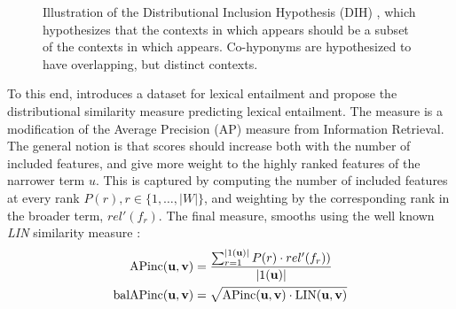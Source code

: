 \begin{figure}
\centering
{}
\caption{Illustration of the Distributional Inclusion Hypothesis (DIH)
  \cite{zhitomirskygeffet:2005:acl}, which hypothesizes that the contexts in
  which  appears should be a subset of the contexts in which
   appears. Co-hyponyms are hypothesized to have overlapping, but
  distinct contexts.}
\label{fig:dih}
\end{figure}

To this end,  introduces a dataset for lexical
entailment and propose the distributional similarity measure {\balAPinc}
predicting lexical entailment.  The {\balAPinc} measure is a modification of
the Average Precision (AP) measure from Information Retrieval. The general
notion is that scores should increase both with the number of included
features, and give more weight to the highly ranked features of the narrower
term $u$. This is captured by computing the number of included features at
every rank $P(r), r\in\{1,\ldots,|W|\}$, and weighting by the corresponding
rank in the broader term, $rel'(f_r)$. The final measure, {\balAPinc} smooths
using the well known {\em LIN} similarity measure \cite{lin:1998:icml}:
\begin{align}
  \mbox{APinc}({\mathbf{u}}, {\mathbf{v}}) & = \frac{\sum_{r=1}^{|1({\mathbf{u}})|}P(r)\cdot rel'(f_r))}{|1({\mathbf{u}})|}\\
  \mbox{balAPinc}({\mathbf{u}}, {\mathbf{v}})  & = \sqrt{\mbox{APinc}({\mathbf{u}}, {\mathbf{v}})\cdot \mbox{LIN}({\mathbf{u}}, {\mathbf{v}})}
\end{align}

